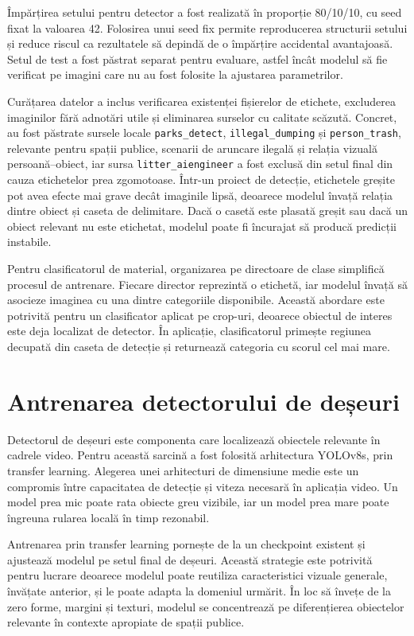 Împărțirea setului pentru detector a fost realizată în proporție 80/10/10, cu seed fixat la valoarea 42. Folosirea unui seed fix permite reproducerea structurii setului și reduce riscul ca rezultatele să depindă de o împărțire accidental avantajoasă. Setul de test a fost păstrat separat pentru evaluare, astfel încât modelul să fie verificat pe imagini care nu au fost folosite la ajustarea parametrilor.

Curățarea datelor a inclus verificarea existenței fișierelor de etichete, excluderea imaginilor fără adnotări utile și eliminarea surselor cu calitate scăzută. Concret, au fost păstrate sursele locale \texttt{parks\_detect}, \texttt{illegal\_dumping} și \texttt{person\_trash}, relevante pentru spații publice, scenarii de aruncare ilegală și relația vizuală persoană--obiect, iar sursa \texttt{litter\_aiengineer} a fost exclusă din setul final din cauza etichetelor prea zgomotoase. Într-un proiect de detecție, etichetele greșite pot avea efecte mai grave decât imaginile lipsă, deoarece modelul învață relația dintre obiect și caseta de delimitare. Dacă o casetă este plasată greșit sau dacă un obiect relevant nu este etichetat, modelul poate fi încurajat să producă predicții instabile.

Pentru clasificatorul de material, organizarea pe directoare de clase simplifică procesul de antrenare. Fiecare director reprezintă o etichetă, iar modelul învață să asocieze imaginea cu una dintre categoriile disponibile. Această abordare este potrivită pentru un clasificator aplicat pe crop-uri, deoarece obiectul de interes este deja localizat de detector. În aplicație, clasificatorul primește regiunea decupată din caseta de detecție și returnează categoria cu scorul cel mai mare.

\section{Antrenarea detectorului de deșeuri}

Detectorul de deșeuri este componenta care localizează obiectele relevante în cadrele video. Pentru această sarcină a fost folosită arhitectura YOLOv8s, prin transfer learning. Alegerea unei arhitecturi de dimensiune medie este un compromis între capacitatea de detecție și viteza necesară în aplicația video. Un model prea mic poate rata obiecte greu vizibile, iar un model prea mare poate îngreuna rularea locală în timp rezonabil.

Antrenarea prin transfer learning pornește de la un checkpoint existent și ajustează modelul pe setul final de deșeuri. Această strategie este potrivită pentru lucrare deoarece modelul poate reutiliza caracteristici vizuale generale, învățate anterior, și le poate adapta la domeniul urmărit. În loc să învețe de la zero forme, margini și texturi, modelul se concentrează pe diferențierea obiectelor relevante în contexte apropiate de spații publice.


